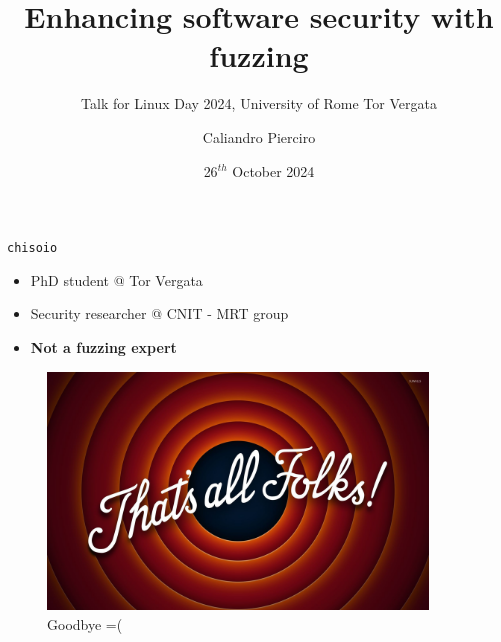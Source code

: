 \documentclass[xcolor=dvipsnames, 12pt]{beamer}
\title[Linux Day 2024]{Enhancing software security with fuzzing}
\subtitle{Talk for Linux Day 2024, University of Rome Tor Vergata}
\author[PC]{Caliandro Pierciro}
\institute[UniTV]{Università degli Studi di Roma Tor Vergata}
\date{26$^{th}$ October 2024}
\begin{document}
\frame{\titlepage}

\begin{frame}{\texttt{chisoio}}
    \begin{minipage}[t]{0.5\textwidth}
    \begin{itemize}
                \item PhD student @ Tor Vergata
                \item Security researcher @ CNIT - MRT group
                \item \textbf{Not a fuzzing expert}
    \end{itemize}
    \end{minipage}%
    \begin{minipage}[t]{0.5\textwidth}
    \begin{figure}
    \end{figure}
    \end{minipage}
\end{frame}

\begin{frame}
        \begin{figure}
                \begin{center}
                        \includegraphics[width=0.9\textwidth]{assets/thatsall.jpg}
                \end{center}
                \caption{Goodbye =(}
        \end{figure}
\end{frame}
\end{document}
